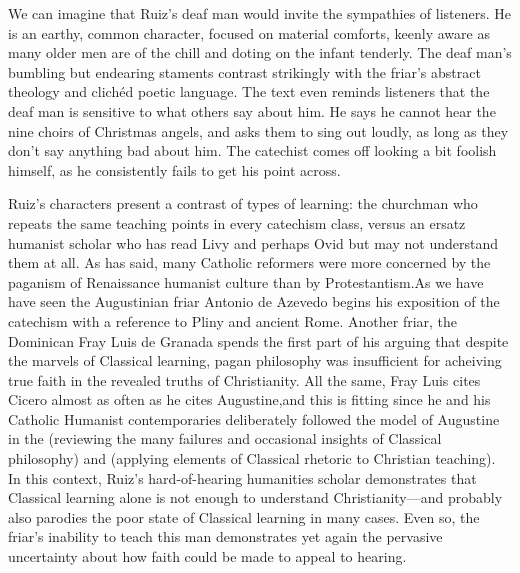 We can imagine that Ruiz's deaf man would invite the sympathies of listeners.
He is an earthy, common character, focused on material comforts, keenly aware as many older men are of the chill and doting on the infant tenderly.
The deaf man's bumbling but endearing staments contrast strikingly with the friar's abstract theology and clichéd poetic language.
The text even reminds listeners that the deaf man is sensitive to what others say about him.
He says he cannot hear the nine choirs of Christmas angels, and asks them to sing out loudly, as long as they don't say anything bad about him.
The catechist comes off looking a bit foolish himself, as he consistently fails to get his point across.

Ruiz's characters present a contrast of types of learning: the churchman who repeats the same teaching points in every catechism class, versus an ersatz humanist scholar who has read Livy and perhaps Ovid but may not understand them at all.
As \XXX{} has said, many Catholic reformers were more concerned by the paganism of Renaissance humanist culture than by Protestantism.
As we have have seen the Augustinian friar Antonio de Azevedo begins his exposition of the catechism with a reference to Pliny and ancient Rome.
Another friar, the Dominican Fray Luis de Granada spends the first part of his  arguing that despite the marvels of Classical learning, pagan philosophy was insufficient for acheiving true faith in the revealed truths of Christianity.
All the same, Fray Luis cites Cicero almost as often as he cites Augustine, and this is fitting since he and his Catholic Humanist contemporaries deliberately followed the model of Augustine in the  (reviewing the many failures and occasional insights of Classical philosophy) and  (applying elements of Classical rhetoric to Christian teaching).\citXXX{}
In this context, Ruiz's hard-of-hearing humanities scholar demonstrates that Classical learning alone is not enough to understand Christianity---and probably also parodies the poor state of Classical learning in many cases.
Even so, the friar's inability to teach this man demonstrates yet again the pervasive uncertainty about how faith could be made to appeal to hearing.

